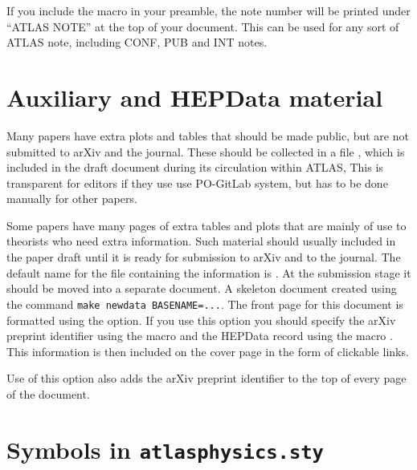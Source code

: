 If you include the macro  in your preamble,
the note number will be printed under \enquote{ATLAS NOTE} at the top of your document.
This can be used for any sort of ATLAS note, including CONF, PUB and INT notes.


\section{Auxiliary and HEPData material}
\label{sec:auxmat}

Many papers have extra plots and tables that should be made public,
but are not submitted to arXiv and the journal.
These should be collected in a file ,
which is included in the draft document during its circulation within ATLAS,
This is transparent for editors if they use use PO-GitLab system,
but has to be done manually for other papers.

Some papers have many pages of extra tables and plots that are mainly of use to theorists
who need extra information.
Such material should usually included in the paper draft until it is ready for
submission to arXiv and to the journal.
The default name for the file containing the information is .
At the submission stage it should be moved into a separate document.
A skeleton document created using the command \verb|make newdata BASENAME=...|.
The front page for this document is formatted using the  option.
If you use this option you should specify the arXiv preprint identifier
using the macro  and the HEPData record using the macro
.
This information is then included on the cover page in the form of clickable links.

Use of this option also adds the arXiv preprint identifier to the top
of every page of the document.



\section{Symbols in \texttt{atlasphysics.sty}}
\label{sec:atlasphysics}

